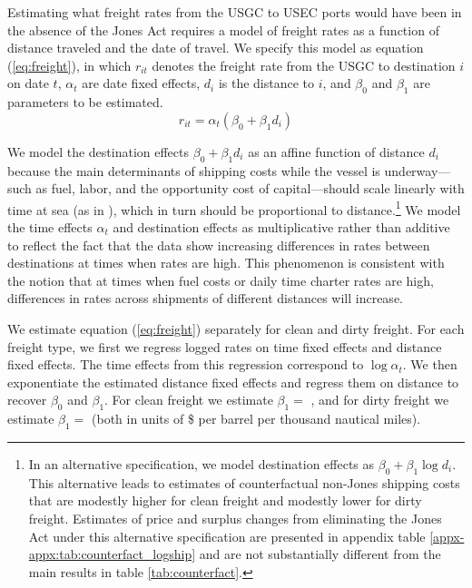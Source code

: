 \documentclass[12pt]{article}
\begin{document}
Estimating what freight rates from the USGC to USEC ports would have been in the absence of the Jones Act requires a model of freight rates as a function of distance traveled and the date of travel. We specify this model as equation (\ref{eq:freight}), in which $r_{it}$ denotes the freight rate from the USGC to destination $i$ on date $t$, $\alpha_t$ are date fixed effects, $d_i$ is the distance to $i$, and $\beta_0$ and $\beta_1$ are parameters to be estimated.
\begin{equation}
r_{it} = \alpha_t(\beta_0 + \beta_1d_i) \label{eq:freight}
\end{equation}

We model the destination effects $\beta_0 + \beta_1d_i$ as an affine function of distance $d_i$ because the main determinants of shipping costs while the vessel is underway---such as fuel, labor, and the opportunity cost of capital---should scale linearly with time at sea (as in \cite{brancaccioetal2020}), which in turn should be proportional to distance.\footnote{In an alternative specification, we model destination effects as $\beta_0 + \beta_1\log d_i$. This alternative leads to estimates of counterfactual non-Jones shipping costs that are modestly higher for clean freight and modestly lower for dirty freight. Estimates of price and surplus changes from eliminating the Jones Act under this alternative specification are presented in appendix table \ref{appx-appx:tab:counterfact_logship} and are not substantially different from the main results in table \ref{tab:counterfact}.\label{fn:logs}}
We model the time effects $\alpha_t$ and destination effects as multiplicative rather than additive to reflect the fact that the data show increasing differences in rates between destinations at times when rates are high. This phenomenon is consistent with the notion that at times when fuel costs or daily time charter rates are high, differences in rates across shipments of different distances will increase.

We estimate equation (\ref{eq:freight}) separately for clean and dirty freight. For each freight type, we first we regress logged rates on time fixed effects and distance fixed effects. The time effects from this regression correspond to $\log\alpha_t$. We then exponentiate the estimated distance fixed effects and regress them on distance to recover $\beta_0$ and $\beta_1$. For clean freight we estimate $\beta_1=$ \unskip, and for dirty freight we estimate $\beta_1=$ (both in units of \$ per barrel per thousand nautical miles).
\end{document}
